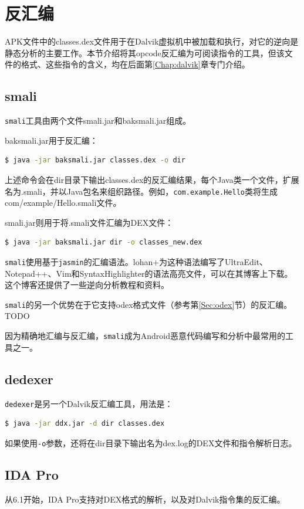 \section{反汇编}
APK文件中的classes.dex文件用于在Dalvik虚拟机中被加载和执行，对它的逆向是静态分析的主要工作。本节介绍将其opcode反汇编为可阅读指令的工具，但该文件的格式、这些指令的含义，均在后面第\ref{Chap:dalvik}章专门介绍。

\subsection{smali}
\lstinline!smali!\cite{url:smali}工具由两个文件smali.jar和baksmali.jar组成。

baksmali.jar用于反汇编：
\begin{lstlisting}[language=bash, numbers=none]
 $ java -jar baksmali.jar classes.dex -o dir
\end{lstlisting}
上述命令会在dir目录下输出classes.dex的反汇编结果，每个Java类一个文件，扩展名为.smali，并以Java包名来组织路径。例如，\lstinline!com.example.Hello!类将生成com/example/Hello.smali文件。

smali.jar则用于将.smali文件汇编为DEX文件：
\begin{lstlisting}[language=bash, numbers=none]
 $ java -jar baksmali.jar dir -o classes_new.dex
\end{lstlisting}

\lstinline!smali!使用基于\lstinline!jasmin!\cite{url:jasmin}的汇编语法。lohan+为这种语法编写了UltraEdit、Notepad++、Vim和SyntaxHighlighter的语法高亮文件，可以在其博客上下载\cite{url:androidcracking}。这个博客还提供了一些逆向分析教程和资料。

\lstinline!smali!的另一个优势在于它支持odex格式文件（参考第\ref{Sec:odex}节）的反汇编。TODO

因为精确地汇编与反汇编，\lstinline!smali!成为Android恶意代码编写和分析中最常用的工具之一。

\subsection{dedexer}
\lstinline!dedexer!\cite{url:dedexer}是另一个Dalvik反汇编工具，用法是：
\begin{lstlisting}[language=bash, numbers=none]
 $ java -jar ddx.jar -d dir classes.dex
\end{lstlisting}
如果使用\lstinline!-o!参数，还将在dir目录下输出名为dex.log的DEX文件和指令解析日志。

\subsection{IDA Pro}
从6.1开始，IDA Pro支持对DEX格式的解析，以及对Dalvik指令集的反汇编。

